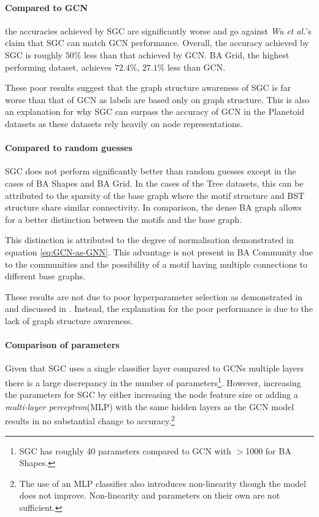 \paragraph{Compared to GCN}
the accuracies achieved by SGC are significantly worse and go against \textit{Wu et al.}'s claim that SGC can match GCN performance.
Overall, the accuracy achieved by SGC is roughly $50\%$ less than that achieved by GCN.
BA Grid, the highest performing dataset, achieves $72.4\%$, $27.1\%$ less than GCN.

These poor results suggest that the graph structure awareness of SGC is far worse than that of GCN as labels are based only on graph structure.
This is also an explanation for why SGC can surpass the accuracy of GCN in the Planetoid~\cite{kipf2016semi} datasets as these datasets rely heavily on node representations.

\paragraph{Compared to random guesses}
SGC does not perform significantly better than random guesses except in the cases of BA Shapes and BA Grid.
In the cases of the Tree datasets, this can be attributed to the sparsity of the base graph where the motif structure and BST structure share similar connectivity.
In comparison, the dense BA graph allows for a better distinction between the motifs and the base graph.

This distinction is attributed to the degree of normalisation demonstrated in equation \ref{eq:GCN-as-GNN}.
This advantage is not present in BA Community due to the communities and the possibility of a motif having multiple connections to different base graphs.

These results are not due to poor hyperparameter selection as demonstrated in  and discussed in .
Instead, the explanation for the poor performance is due to the lack of graph structure awareness.

\paragraph{Comparison of parameters}
Given that SGC uses a single classifier layer compared to GCNs multiple layers there is a large discrepancy in the number of parameters\footnote{SGC has roughly 40 parameters compared to GCN with $>$1000 for BA Shapes.}.
However, increasing the parameters for SGC by either increasing the node feature size or adding a \emph{multi-layer perceptron}(MLP) with the same hidden layers as the GCN model results in no substantial change to accuracy.\footnote{The use of an MLP classifier also introduces non-linearity though the model does not improve. Non-linearity and parameters on their own are not sufficient.}

